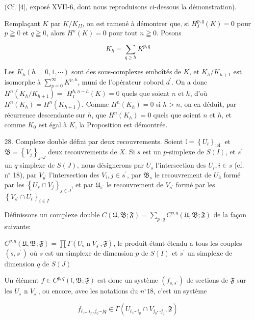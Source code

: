 (Cf. [4], exposé XVII-6, dont nous reproduisons ci-dessous la démonstration).

Remplaçant $K$ par $K / K_{I I}$, on est ramené à démontrer que, si $H_{I}^{p, q}(K)=0$ pour $p \geqq 0$ et $q \geqq 0$, alors $H^{n}(K)=0$ pour tout $n \geqq 0 .$ Posons

$$
K_{h}=\sum_{q \geq h} K^{p, q}
$$

Les $K_{h}(h=0,1, \cdots)$ sont des sous-complexes emboîtés de $K$, et $K_{h} / K_{h+1}$ est isomorphe à $\sum_{p=0}^{\infty} K^{p, h}$, muni de l'opérateur cobord $d^{\prime}$. On a donc $H^{n}\left(K_{h} / K_{h+1}\right)=$ $H_{I}^{h, n-h}(K)=0$ quels que soient $n$ et $h$, d'où $H^{n}\left(K_{h}\right)=H^{n}\left(K_{h+1}\right)$. Comme $H^{n}\left(K_{h}\right)=0$ si $h>n$, on en déduit, par récurrence descendante sur $h$, que $H^{n}\left(K_{h}\right)=0$ quels que soient $n$ et $h$, et comme $K_{0}$ est égal à $K$, la Proposition est démontrée.

28. Complexe double défini par deux recouvrements. Soient $\mathfrak{l}=\left\{U_{i}\right\}_{\text {ieI }}$ et $\mathfrak{B}=\left\{V_{j}\right\}_{j e J}$ deux recouvrements de $X .$ Si $s$ est un $p$-simplexe de $S(I)$, et $s^{\prime}$ un $q$-simplexe de $S(J)$, nous désignerons par $U_{s}$ l'intersection des $U_{i}, i \in s$ (cf. $\mathrm{n}^{\circ}$ 18), par $V_{\mathfrak{s}^{\prime}}$ l'intersection des $V_{i}, j \in s^{\prime}$, par $\mathfrak{B}_{s}$ le recouvrement de $U_{3}$ formé par les $\left\{U_{s} \cap V_{j}\right\}_{j \in J}$, et par $\mathfrak{U}_{s^{\prime}}$ le recouvrement de $V_{s^{\prime}}$ formé par les $\left\{V_{s^{\prime}} \cap U_{i}\right\}_{i \in I}$

Définissons un complexe double $C(\mathfrak{U}, \mathfrak{B} ; \mathfrak{F})=\sum_{p \cdot q} C^{p, q}(\mathfrak{U}, \mathfrak{B} ; \mathfrak{F})$ de la façon suivante:

$C^{p, q}(\mathfrak{U}, \mathfrak{B} ; \mathfrak{F})=\prod \Gamma\left(U_{\mathrm{s}} \operatorname{n} V_{s^{\prime}}, \mathfrak{F}\right)$, le produit étant étendu a tous les couples $\left(s, s^{\prime}\right)$ où $s$ est un simplexe de dimension $p$ de $S(I)$ et $s^{\prime}$ un simplexe de dimension $q$ de $S(J)$

Un élément $f \in C^{p, q}(\mathfrak{l}, \mathfrak{B} ; \mathfrak{F})$ est donc un système $\left(f_{s, s^{\prime}}\right)$ de sections de $\mathfrak{F}$ sur les $U_{s}$ n $V_{s^{\prime}}$, ou encore, avec les notations du $n^{\circ} 18$, c'est un système

$$
f_{i_{0} \ldots i_{p}, j_{0} \cdots j q} \in \Gamma\left(U_{i_{0} \cdots i_{p}} \cap V_{j_{0} \cdots j_{q}}, \mathfrak{F}\right)
$$


